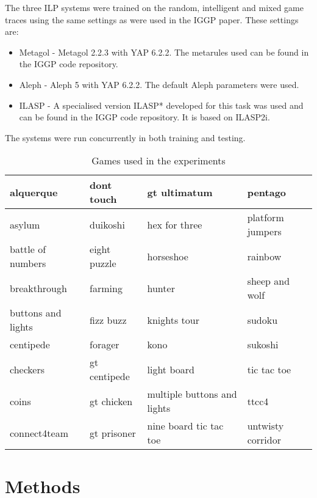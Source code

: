 The three ILP systems were trained on the random, intelligent and mixed game traces using the same settings as were used in the IGGP paper\cite{Cropper/IGGP}. These settings are:
\begin{itemize}
	\item Metagol - Metagol 2.2.3 with YAP 6.2.2. The metarules used can be found in the IGGP code repository.
	\item Aleph - Aleph 5 with YAP 6.2.2. The default Aleph parameters were used.
	\item ILASP - A specialised version ILASP* developed for this task was used and can be found in the IGGP code repository. It is based on ILASP2i.
\end{itemize}
The systems were run concurrently in both training and testing.


\begin{table}[]
\begin{tabular}{|l|l|l|l|}
	\hline
	alquerque           & dont touch    & gt ultimatum              & pentago\\ \hline
	asylum              & duikoshi      & hex for   three               & platform jumpers\\ \hline
	battle of numbers   & eight puzzle  & horseshoe                 & rainbow\\ \hline
	breakthrough        & farming       & hunter                    & sheep and wolf\\ \hline
	buttons and lights  & fizz buzz      & knights tour              & sudoku\\ \hline
	centipede           & forager       & kono                      & sukoshi\\ \hline
	checkers            & gt centipede  & light board                & tic tac toe \\ \hline
	coins               & gt chicken    & multiple buttons and lights  & ttcc4 \\ \hline
	connect4team        & gt prisoner   & nine board tic tac toe        & untwisty corridor \\ \hline
\end{tabular}
\caption{Games used in the experiments}
\label{tab:Games}
\end{table}


\section{Methods}
